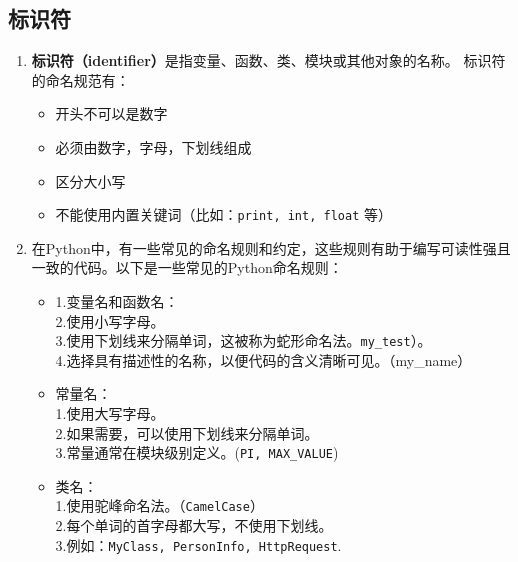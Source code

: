 
\begin{issues}
\issueDraft
\end{issues}

\subsection{标识符}

\begin{enumerate}
\item \textbf{标识符（identifier）}是指变量、函数、类、模块或其他对象的名称。 标识符的命名规范有：
\begin{itemize}
\item 开头不可以是数字
\item 必须由数字，字母，下划线组成
\item 区分大小写
\item 不能使用内置关键词（比如：\verb`print, int, float` 等）
\end{itemize}
\item 在Python中，有一些常见的命名规则和约定，这些规则有助于编写可读性强且一致的代码。以下是一些常见的Python命名规则：
\begin{itemize}
\item
1.变量名和函数名：\\
2.使用小写字母。\\
3.使用下划线来分隔单词，这被称为蛇形命名法。\verb`my_test`）。\\
4.选择具有描述性的名称，以便代码的含义清晰可见。（my_name）

\item 常量名：\\
1.使用大写字母。\\
2.如果需要，可以使用下划线来分隔单词。\\
3.常量通常在模块级别定义。(\verb`PI, MAX_VALUE`)\\
\item 类名：\\
1.使用驼峰命名法。（\verb`CamelCase`）\\
2.每个单词的首字母都大写，不使用下划线。\\
3.例如：\verb`MyClass, PersonInfo, HttpRequest`.
\end{itemize}
\end{enumerate}


